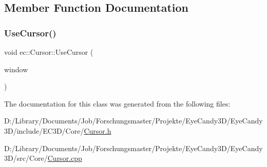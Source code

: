 \subsection{Member Function Documentation}
\mbox{\label{classec_1_1_cursor_a9d1fe4db14b76b01715a89f91e9c2216}} 
\subsubsection{\texorpdfstring{Use\+Cursor()}{UseCursor()}}
{\footnotesize\ttfamily void ec\+::\+Cursor\+::\+Use\+Cursor (\begin{DoxyParamCaption}\item[{G\+L\+F\+Wwindow $\ast$}]{window }\end{DoxyParamCaption})}



The documentation for this class was generated from the following files\+:\begin{DoxyCompactItemize}
\item 
D\+:/\+Library/\+Documents/\+Job/\+Forschungsmaster/\+Projekte/\+Eye\+Candy3\+D/\+Eye\+Candy3\+D/include/\+E\+C3\+D/\+Core/\mbox{\hyperlink{_cursor_8h}{Cursor.\+h}}\item 
D\+:/\+Library/\+Documents/\+Job/\+Forschungsmaster/\+Projekte/\+Eye\+Candy3\+D/\+Eye\+Candy3\+D/src/\+Core/\mbox{\hyperlink{_cursor_8cpp}{Cursor.\+cpp}}\end{DoxyCompactItemize}
